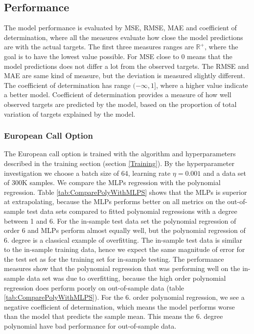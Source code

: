 \subsection{Performance}
The model performance is evaluated by MSE, RMSE, MAE and coefficient of determination, where all the measures evaluate how close the model predictions are with the actual targets. The first three measures ranges are $\mathbb{R}^+$, where the goal is to have the lowest value possible. For MSE close to 0 means that the model predictions does not differ a lot from the observed targets. The RMSE and MAE are same kind of measure, but the deviation is measured slightly different. The coefficient of determination has range $(-\infty, 1]$, where a higher value indicate a better model. Coefficient of determination provides a measure of how well observed targets are predicted by the model, based on the proportion of total variation of targets explained by the model.

\subsubsection{European Call Option}
The European call option is trained with the algorithm and hyperparameters described in the training section (section \ref{Training}). By the hyperparameter investigation we choose a batch size of 64, learning rate $\eta = 0.001$ and a data set of 300K samples. We compare the MLPs regression with the polynomial regression. Table \ref{tab:ComparePolyWithMLPS} shows that the MLPs is superior at extrapolating, because the MLPs performs better on all metrics on the out-of-sample test data sets compared to fitted polynomial regressions with a degree between 1 and 6. For the in-sample test data set the polynomial regression of order 6 and MLPs perform almost equally well, but the polynomial regression of 6. degree is a classical example of overfitting. The in-sample test data is similar to the in-sample training data, hence we expect the same magnitude of error for the test set as for the training set for in-sample testing. The performance measures show that the polynomial regression that was performing well on the in-sample data set was due to overfitting, because the high order polynomial regression does perform poorly on out-of-sample data (table \ref{tab:ComparePolyWithMLPS}). For the 6. order polynomial regression, we see a negative coefficient of determination, which means the model performs worse than the model that predicts the sample mean. This means the 6. degree polynomial have bad performance for out-of-sample data. \\

